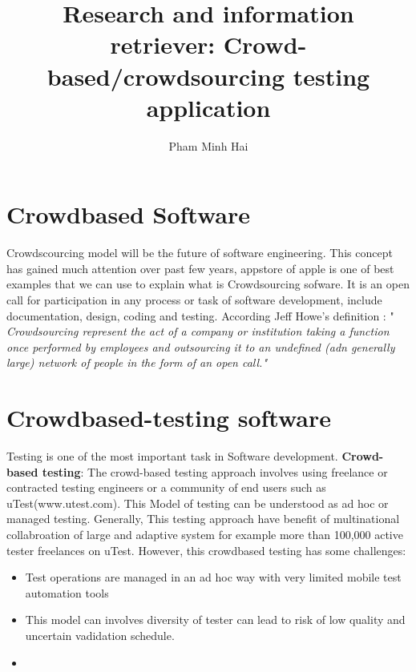 \documentclass[a4paper,10pt]{article}
\title{Research and information retriever: Crowd-based/crowdsourcing testing application}
\author{Pham Minh Hai}
\begin{document}
\maketitle
\tableofcontents

\section{Crowdbased Software}
 Crowdscourcing model  will be the future of software engineering. This concept has gained much attention over past few years, appstore of apple is one of best examples that we can use to explain what is Crowdsourcing sofware. 
 It is an open call for participation in any process or task of software development, include documentation, design, coding and testing. According Jeff Howe's definition : "\textit{ Crowdsourcing represent the act of a company or institution taking a function once performed by employees and outsourcing it to an undefined (adn generally large) network of people in the form of an open call."} \cite{crowdsourcing}
 
\section{Crowdbased-testing software}

Testing is one of the most important task in Software development. 
\textbf{Crowd-based testing}:\cite{Mobiletest} 
The crowd-based testing approach involves using freelance or contracted testing engineers or a community of end users such as uTest(www.utest.com). This Model of testing can be understood as ad hoc or managed testing. Generally, This testing approach have benefit of multinational collabroation of large and adaptive system for example more than 100,000 active tester freelances on uTest. However, this crowdbased testing has some challenges:\\
\begin{itemize}
	\item  Test operations are managed in an ad hoc way with very limited mobile test automation tools
	\item  This model can involves diversity of tester can lead to risk of low quality and uncertain vadidation schedule.
	\item 
	
\end{itemize}

\medskip
\printbibliography
\end{document}
